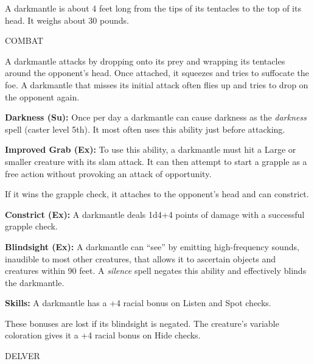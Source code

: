\documentclass{article}
\begin{document}
A darkmantle is about 4 feet long from the tips of its tentacles to the top of 
its head. It weighs about 30 pounds.

COMBAT

A darkmantle attacks by dropping onto its prey and wrapping its tentacles around 
the opponent's head. Once attached, it squeezes and tries to suffocate the foe. 
A darkmantle that misses its initial attack often flies up and tries to drop on 
the opponent again.

\textbf{Darkness (Su): }Once per day a darkmantle can cause darkness as the \textit{darkness 
}spell (caster level 5th). It most often uses this ability just before attacking.

\textbf{Improved Grab (Ex): }To use this ability, a darkmantle must hit a Large 
or smaller creature with its slam attack. It can then attempt to start a grapple 
as a free action without provoking an attack of opportunity.

If it wins the grapple check, it attaches to the opponent's head and can constrict.

\textbf{Constrict (Ex): }A darkmantle deals 1d4+4 points of damage with a successful 
grapple check.

\textbf{Blindsight (Ex): }A darkmantle can ``see'' by emitting high-frequency sounds, 
inaudible to most other creatures, that allows it to ascertain objects and creatures 
within 90 feet. A \textit{silence }spell negates this ability and effectively blinds 
the darkmantle.

\textbf{Skills: }A darkmantle has a +4 racial bonus on Listen and Spot checks.

These bonuses are lost if its blindsight is negated. The creature's variable coloration 
gives it a +4 racial bonus on Hide checks.

\vspace{12pt}
{\LARGE{}DELVER}
\end{document}
